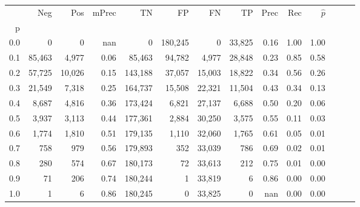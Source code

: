 \begin{tabular}{rrrrrrrrrrrrrr}
\toprule
{} &     Neg &     Pos & mPrec &       TN &       FP &      FN &      TP &  Prec &   Rec & $\hat{p}$ \\
p   &         &         &       &          &          &         &         &       &       &           \\
\midrule
0.0 &       0 &       0 &   nan &        0 &  180,245 &       0 &  33,825 &  0.16 &  1.00 &      1.00 \\
0.1 &  85,463 &   4,977 &  0.06 &   85,463 &   94,782 &   4,977 &  28,848 &  0.23 &  0.85 &      0.58 \\
0.2 &  57,725 &  10,026 &  0.15 &  143,188 &   37,057 &  15,003 &  18,822 &  0.34 &  0.56 &      0.26 \\
0.3 &  21,549 &   7,318 &  0.25 &  164,737 &   15,508 &  22,321 &  11,504 &  0.43 &  0.34 &      0.13 \\
0.4 &   8,687 &   4,816 &  0.36 &  173,424 &    6,821 &  27,137 &   6,688 &  0.50 &  0.20 &      0.06 \\
0.5 &   3,937 &   3,113 &  0.44 &  177,361 &    2,884 &  30,250 &   3,575 &  0.55 &  0.11 &      0.03 \\
0.6 &   1,774 &   1,810 &  0.51 &  179,135 &    1,110 &  32,060 &   1,765 &  0.61 &  0.05 &      0.01 \\
0.7 &     758 &     979 &  0.56 &  179,893 &      352 &  33,039 &     786 &  0.69 &  0.02 &      0.01 \\
0.8 &     280 &     574 &  0.67 &  180,173 &       72 &  33,613 &     212 &  0.75 &  0.01 &      0.00 \\
0.9 &      71 &     206 &  0.74 &  180,244 &        1 &  33,819 &       6 &  0.86 &  0.00 &      0.00 \\
1.0 &       1 &       6 &  0.86 &  180,245 &        0 &  33,825 &       0 &   nan &  0.00 &      0.00 \\
\bottomrule
\end{tabular}
